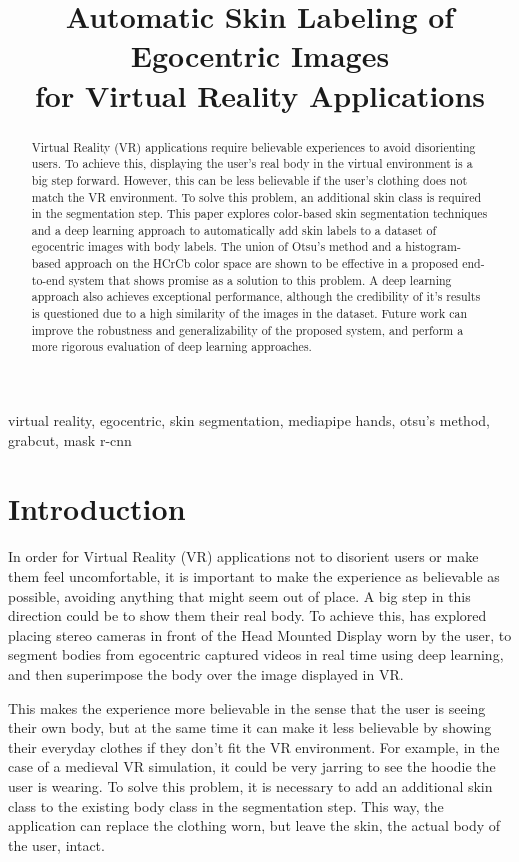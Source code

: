 \documentclass[conference]{IEEEtran}
\title{Automatic Skin Labeling of Egocentric Images \\ for Virtual Reality Applications}
\author{\IEEEauthorblockN{1\textsuperscript{st} Heiko Raible}
	\IEEEauthorblockA{\textit{Natural Science and Mathematics} \\
		\textit{h\_da Hochschule Darmstadt}\\
		Darmstadt, Germany \\
		heiko.raible@stud.h-da.de}
}
\begin{document}
\maketitle

\begin{abstract}
Virtual Reality (VR) applications require believable experiences to avoid disorienting users. To achieve this, displaying the user's real body in the virtual environment is a big step forward. However, this can be less believable if the user's clothing does not match the VR environment. To solve this problem, an additional skin class is required in the segmentation step. This paper explores color-based skin segmentation techniques and a deep learning approach to automatically add skin labels to a dataset of egocentric images with body labels. The union of Otsu's method and a histogram-based approach on the HCrCb color space are shown to be effective in a proposed end-to-end system that shows promise as a solution to this problem. A deep learning approach also achieves exceptional performance, although the credibility of it's results is questioned due to a high similarity of the images in the dataset. Future work can improve the robustness and generalizability of the proposed system, and perform a more rigorous evaluation of deep learning approaches.
\end{abstract}

\begin{IEEEkeywords}
virtual reality, egocentric, skin segmentation, mediapipe hands, otsu's method, grabcut, mask r-cnn
\end{IEEEkeywords}

\section{Introduction}

In order for Virtual Reality (VR) applications not to disorient users or make them feel uncomfortable, it is important to make the experience as believable as possible, avoiding anything that might seem out of place. A big step in this direction could be to show them their real body. To achieve this, \cite{b1} has explored placing stereo cameras in front of the Head Mounted Display worn by the user, to segment bodies from egocentric captured videos in real time using deep learning, and then superimpose the body over the image displayed in VR.

This makes the experience more believable in the sense that the user is seeing their own body, but at the same time it can make it less believable by showing their everyday clothes if they don't fit the VR environment. For example, in the case of a medieval VR simulation, it could be very jarring to see the hoodie the user is wearing. To solve this problem, it is necessary to add an additional skin class to the existing body class in the segmentation step. This way, the application can replace the clothing worn, but leave the skin, the actual body of the user, intact.
\end{document}
